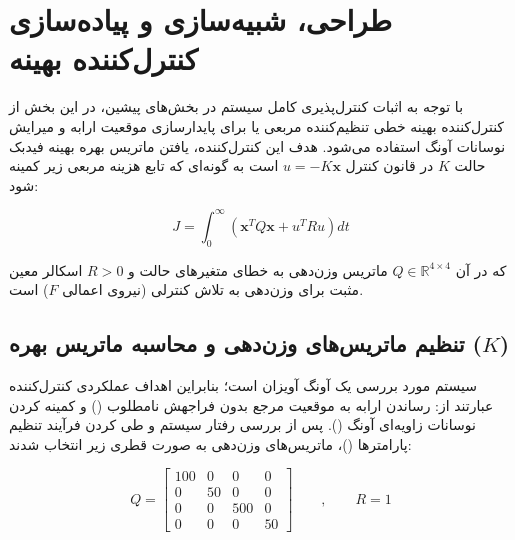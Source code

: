 \documentclass[a4paper,12pt]{article}
\begin{document}
\section{طراحی، شبیه‌سازی و پیاده‌سازی کنترل‌کننده بهینه }
\label{sec:lqr_design}

با توجه به اثبات کنترل‌پذیری کامل سیستم در بخش‌های پیشین، در این بخش از کنترل‌کننده بهینه خطی تنظیم‌کننده مربعی یا  برای پایدارسازی موقعیت ارابه و میرایش نوسانات آونگ استفاده می‌شود. هدف این کنترل‌کننده، یافتن ماتریس بهره بهینه فیدبک حالت $K$ در قانون کنترل $u = -K\mathbf{x}$ است به گونه‌ای که تابع هزینه مربعی زیر کمینه شود:

\begin{equation}
    J = \int_{0}^{\infty} \left( \mathbf{x}^T Q \mathbf{x} + u^T R u \right) dt
\end{equation}

که در آن $Q \in \mathbb{R}^{4 \times 4}$ ماتریس وزن‌دهی به خطای متغیرهای حالت و $R > 0$ اسکالر معین مثبت برای وزن‌دهی به تلاش کنترلی (نیروی اعمالی $F$) است.

\subsection{تنظیم ماتریس‌های وزن‌دهی و محاسبه ماتریس بهره ($K$)}

سیستم مورد بررسی یک آونگ آویزان است؛ بنابراین اهداف عملکردی کنترل‌کننده عبارتند از: رساندن ارابه به موقعیت مرجع بدون فراجهش نامطلوب () و کمینه کردن نوسانات زاویه‌ای آونگ (). پس از بررسی رفتار سیستم و طی کردن فرآیند تنظیم پارامترها ()، ماتریس‌های وزن‌دهی به صورت قطری زیر انتخاب شدند:

\begin{equation}
    Q =
    \begin{bmatrix}
        100 & 0  & 0   & 0  \\
        0   & 50 & 0   & 0  \\
        0   & 0  & 500 & 0  \\
        0   & 0  & 0   & 50
    \end{bmatrix}
    \qquad , \qquad
    R = 1
\end{equation}
\end{document}
